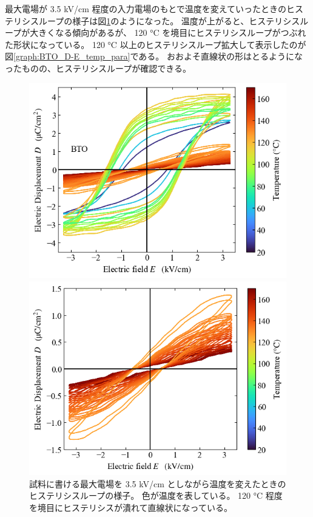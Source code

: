 \documentclass[9pt,dvipdfmx,a4paper]{jsarticle}
\begin{document}
最大電場が 3.5 kV/cm 程度の入力電場のもとで温度を変えていったときのヒステリシスループの様子は図\ref{graph:BTO_D-E_temp}のようになった。
温度が上がると、ヒステリシスループが大きくなる傾向があるが、
120 \si{\degreeCelsius} を境目にヒステリシスループがつぶれた形状になっている。
120 \si{\degreeCelsius} 以上のヒステリシスループ拡大して表示したのが図\ref{graph:BTO_D-E_temp_para}である。
おおよそ直線状の形はとるようになったものの、ヒステリシスループが確認できる。
\begin{figure}[H]
    \begin{minipage}[t]{0.48\columnwidth}
        \centering
        \includegraphics[width=\columnwidth]{BTO_D-E.png}
        \caption{\small{試料に書ける最大電場を 3.5 kV/cm としながら温度を変えたときのヒステリシスループの様子。
        色が温度を表している。
        120 \si{\degreeCelsius} 程度を境目にヒステリシスが潰れて直線状になっている。}}
        \label{graph:BTO_D-E_temp}
    \end{minipage}
    \hfill
    \begin{minipage}[t]{0.48\columnwidth}
        \centering
        \includegraphics[width=\columnwidth]{BTO_D-E_para.png}

\end{minipage}
\end{figure}
\end{document}
